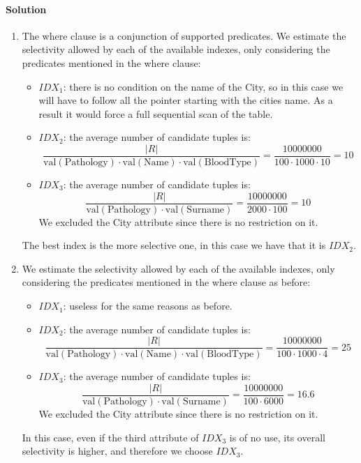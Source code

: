 \paragraph*{Solution}
\begin{enumerate}
    \item The where clause is a conjunction of supported predicates.
        We estimate the selectivity allowed by each of the available indexes, only considering the predicates mentioned in the where clause:
        \begin{itemize}
            \item $IDX_1$: there is no condition on the name of the City, so in this case we will have to follow all the pointer starting with the cities name. 
                As a result it would force a full sequential scan of the table.
            \item $IDX_2$: the average number of candidate tuples is: 
                \[\dfrac{\left\lvert R \right\rvert }{\text{val}(\text{Pathology}) \cdot \text{val}(\text{Name}) \cdot \text{val}(\text{BloodType})}=\dfrac{10000000}{100 \cdot 1000 \cdot 10}=10\]
            \item $IDX_3$: the average number of candidate tuples is: 
                \[\dfrac{\left\lvert R \right\rvert }{\text{val}(\text{Pathology}) \cdot \text{val}(\text{Surname}) }=\dfrac{10000000}{2000 \cdot 100}=10\]
                We excluded the City attribute since there is no restriction on it. 
        \end{itemize}
        The best index is the more selective one, in this case we have that it is $IDX_2$. 
    \item We estimate the selectivity allowed by each of the available indexes, only considering the predicates mentioned in the where clause as before:
        \begin{itemize}
            \item $IDX_1$: useless for the same reasons as before. 
            \item $IDX_2$: the average number of candidate tuples is: 
                \[\dfrac{\left\lvert R \right\rvert }{\text{val}(\text{Pathology}) \cdot \text{val}(\text{Name}) \cdot \text{val}(\text{BloodType})}=\dfrac{10000000}{100 \cdot 1000 \cdot 4}=25\]
            \item $IDX_3$: the average number of candidate tuples is: 
                \[\dfrac{\left\lvert R \right\rvert }{\text{val}(\text{Pathology}) \cdot \text{val}(\text{Surname}) }=\dfrac{10000000}{100 \cdot 6000}=16.6\]
                We excluded the City attribute since there is no restriction on it. 
        \end{itemize}
        In this case, even if the third attribute of $IDX_3$ is of no use, its overall selectivity is higher, and therefore we choose $IDX_3$.
\end{enumerate}